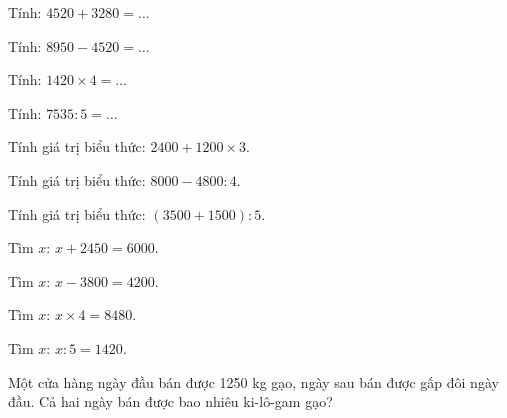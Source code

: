 \begin{ex}
Tính: $4520 + 3280 = \dots$
\end{ex}

\begin{ex}
Tính: $8950 - 4520 = \dots$
\end{ex}

\begin{ex}
Tính: $1420 \times 4 = \dots$
\end{ex}

\begin{ex}
Tính: $7535 : 5 = \dots$
\end{ex}

\begin{ex}
Tính giá trị biểu thức: $2400 + 1200 \times 3$.
\end{ex}

\begin{ex}
Tính giá trị biểu thức: $8000 - 4800 : 4$.
\end{ex}

\begin{ex}
Tính giá trị biểu thức: $(3500 + 1500) : 5$.
\end{ex}

\begin{ex}
Tìm $x$: $x + 2450 = 6000$.
\end{ex}

\begin{ex}
Tìm $x$: $x - 3800 = 4200$.
\end{ex}

\begin{ex}
Tìm $x$: $x \times 4 = 8480$.
\end{ex}

\begin{ex}
Tìm $x$: $x : 5 = 1420$.
\end{ex}

\begin{ex}
Một cửa hàng ngày đầu bán được 1250 kg gạo, ngày sau bán được gấp đôi ngày đầu. Cả hai ngày bán được bao nhiêu ki-lô-gam gạo?
\end{ex}

